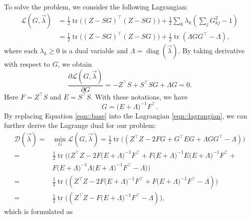\documentclass[12pt]{article}
\DeclareMathOperator{\diag}{diag}
\DeclareMathOperator{\tr}{tr}
\begin{document}
\begin{appendices}
  To solve the problem, we consider the following Lagrangian:
  \begin{equation}
    \label{eqn::lagrangian}
    \begin{split}
      \mathcal{L} (G, \vec{\lambda}) & = \frac{1}{2} \tr \big( (Z - S G)^\intercal (Z - S G) \big) + \frac{1}{2} \sum_k \lambda_k  ( \sum_j G_{kj}^2 - 1)\\
      & = \frac{1}{2} \tr \big( (Z - S G)^\intercal (Z - S G) \big) + \frac{1}{2} \tr(\Lambda G G^\intercal - \Lambda), 
    \end{split}
  \end{equation}
  where each $\lambda_k \geq 0$ is a dual variable and $\Lambda = \diag(\vec{\lambda})$. By taking derivative with respect to $G$, we obtain
  \begin{equation*}
    \frac{\partial \mathcal{L} (G, \vec{\lambda})}{\partial G} = - Z^\intercal S + S^\intercal S G + \Lambda G   = 0. 
  \end{equation*}
  Here $F=Z^\intercal S$ and $E = S^\intercal S$. With these notations, we have 
  \begin{equation}
    \label{eqn::base}
    G = \big( E + \Lambda \big)^{-1} F^\intercal.
  \end{equation}
  By replacing Equation \ref{eqn::base} into the Lagrangian \ref{eqn::lagrangian}, we can further derive the Lagrange dual for our problem:
  \begin{equation*}
    \begin{split}
      \mathcal{D} (\vec{\lambda}) = & \min_G \mathcal{L} (G, \vec{\lambda}) = \frac{1}{2} \tr \big(( Z^\intercal Z - 2 F G +  G^\intercal E G + \Lambda G G^\intercal - \Lambda)\big) \\
      = & \frac{1}{2} \tr \big(( Z^\intercal Z - 2 F \big( E + \Lambda \big)^{-1} F^\intercal + F \big( E + \Lambda \big)^{-1} E \big( E + \Lambda \big)^{-1} F^\intercal + \\
      & F \big( E + \Lambda \big)^{-1} \Lambda \big( E + \Lambda \big)^{-1} F^\intercal - \Lambda) \big)\\
      = & \frac{1}{2} \tr \big(( Z^\intercal Z - 2 F \big( E + \Lambda \big)^{-1} F^\intercal + F  \big( E + \Lambda \big)^{-1} F^\intercal - \Lambda) \big)\\
      = & \frac{1}{2} \tr \big(( Z^\intercal Z -  F \big(E + \Lambda \big)^{-1} F^\intercal - \Lambda) \big),
    \end{split}
  \end{equation*}
  which is formulated as
  \begin{equation}

\end{equation}
\end{appendices}
\end{document}
